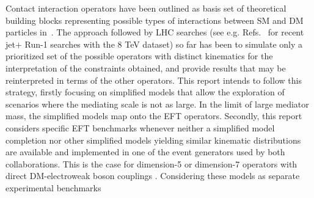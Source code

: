 Contact interaction operators have been outlined as basis set of theoretical
building blocks representing possible types of interactions between SM and DM particles
in~\cite{Goodman:2010ku}. The approach followed by LHC searches (see e.g. Refs.~\cite{Khachatryan:2014rra,Aad:2015zva} 
for recent jet+\MET{} Run-1 searches with the 8 TeV dataset) 
so far has been to simulate only a prioritized set of the possible operators with distinct kinematics
for the interpretation of the constraints obtained, and provide results that may be reinterpreted in terms of the other operators.
This report intends to follow this strategy, firstly focusing on simplified models that allow the exploration 
of scenarios where the mediating scale is not as large.  In the limit of large mediator mass, the simplified models map onto
the EFT operators.
Secondly, this report considers specific EFT benchmarks 
whenever neither a simplified model completion 
nor other simplified models yielding similar kinematic distributions are available 
and implemented in one of the event generators used by both collaborations. 
This is the case for dimension-5 or dimension-7 operators with direct 
DM-electroweak boson couplings .
Considering these models as separate experimental benchmarks 
